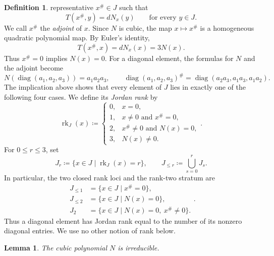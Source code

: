 \documentclass[12pt]{article}
\newtheorem{lemma}[theorem]{Lemma}
\theoremstyle{definition}
\newtheorem{definition}[theorem]{Definition}
\begin{document}
\begin{definition}
representative \(x^\#\in J\) such that
\begin{equation}\label{sharp-definition}
    T(x^\#,y)=dN_x(y)
    \qquad\text{for every }y\in J.
\end{equation}
We call \(x^\#\) the \emph{adjoint} of \(x\).
Since \(N\) is cubic, the map \(x\mapsto x^\#\) is a homogeneous quadratic
polynomial map.
By Euler's identity,
\[
    T(x^\#,x)=dN_x(x)=3N(x).
\]
Thus \(x^\#=0\) implies \(N(x)=0\).
For a diagonal element, the formulas for \(N\) and the adjoint become
\[
    N(\operatorname{diag}(a_1,a_2,a_3))=a_1a_2a_3,
    \qquad
    \operatorname{diag}(a_1,a_2,a_3)^\#
    =\operatorname{diag}(a_2a_3,a_1a_3,a_1a_2).
\]
The implication above shows that every element of \(J\) lies in exactly one
of the following four cases.
We define its \emph{Jordan rank} by
\[
    \operatorname{rk}_J(x)
    \coloneqq
    \begin{cases}
        0,&x=0,\\
        1,&x\ne0\text{ and }x^\#=0,\\
        2,&x^\#\ne0\text{ and }N(x)=0,\\
        3,&N(x)\ne0.
    \end{cases}.
\]
For \(0\leq r\leq3\), set
\[
    J_r\coloneqq\{x\in J\mid\operatorname{rk}_J(x)=r\},
    \qquad
    J_{\leq r}\coloneqq\bigcup_{s=0}^rJ_s.
\]
In particular, the two closed rank loci and the rank-two stratum are
\[
    \begin{aligned}
        J_{\leq1}&=\{x\in J\mid x^\#=0\},\\
        J_{\leq2}&=\{x\in J\mid N(x)=0\},\\
        J_2&=\{x\in J\mid N(x)=0,\ x^\#\ne0\}.
    \end{aligned}.
\]
Thus a diagonal element has Jordan rank equal to the number of its nonzero
diagonal entries. We use no other notion of rank below.
\end{definition}

\begin{lemma}\label{Albert-irreducible}
The cubic polynomial \(N\) is irreducible.
\end{lemma}
\end{document}
